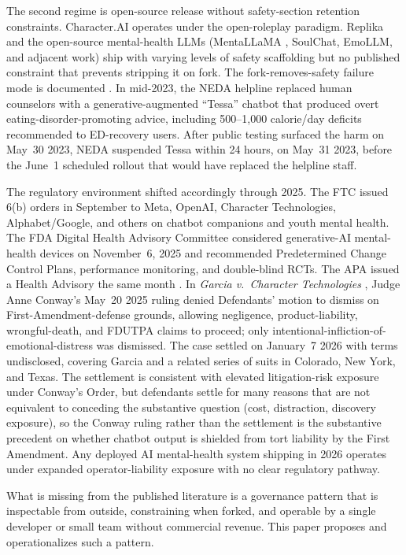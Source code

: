\documentclass[letterpaper]{article} %
\begin{document}
The second regime is open-source release without safety-section retention constraints. Character.AI operates under the open-roleplay paradigm. Replika \citep{maples2024replika} and the open-source mental-health LLMs (MentaLLaMA \citep{yang2024mentallama}, SoulChat, EmoLLM, and adjacent work) ship with varying levels of safety scaffolding but no published constraint that prevents stripping it on fork. The fork-removes-safety failure mode is documented \citep{aiid2023neda}. In mid-2023, the NEDA helpline replaced human counselors with a generative-augmented ``Tessa'' chatbot that produced overt eating-disorder-promoting advice, including 500--1,000 calorie/day deficits recommended to ED-recovery users. After public testing surfaced the harm on May~30 2023, NEDA suspended Tessa within 24 hours, on May~31 2023, before the June~1 scheduled rollout that would have replaced the helpline staff.

The regulatory environment shifted accordingly through 2025. The FTC issued 6(b) orders in September \citep{ftc2025sixb} to Meta, OpenAI, Character Technologies, Alphabet/Google, and others on chatbot companions and youth mental health. The FDA Digital Health Advisory Committee considered generative-AI mental-health devices on November~6, 2025 \citep{fda2025dhac} and recommended Predetermined Change Control Plans, performance monitoring, and double-blind RCTs. The APA issued a Health Advisory the same month \citep{apa2025advisory}. In \emph{Garcia v.\ Character Technologies} \citep{garcia2025character}, Judge Anne Conway's May~20 2025 ruling denied Defendants' motion to dismiss on First-Amendment-defense grounds, allowing negligence, product-liability, wrongful-death, and FDUTPA claims to proceed; only intentional-infliction-of-emotional-distress was dismissed. The case settled on January~7 2026 with terms undisclosed, covering Garcia and a related series of suits in Colorado, New York, and Texas. The settlement is consistent with elevated litigation-risk exposure under Conway's Order, but defendants settle for many reasons that are not equivalent to conceding the substantive question (cost, distraction, discovery exposure), so the Conway ruling rather than the settlement is the substantive precedent on whether chatbot output is shielded from tort liability by the First Amendment. Any deployed AI mental-health system shipping in 2026 operates under expanded operator-liability exposure with no clear regulatory pathway.

What is missing from the published literature is a governance pattern that is inspectable from outside, constraining when forked, and operable by a single developer or small team without commercial revenue. This paper proposes and operationalizes such a pattern.
\end{document}
